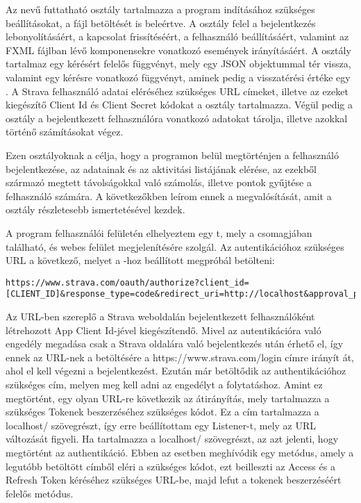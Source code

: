 Az  nevű futtatható osztály tartalmazza a program indításához szükséges beállításokat, a  fájl betöltését is beleértve.
A  osztály felel a bejelentkezés lebonyolításáért, a kapcsolat frissítéséért, a felhasználó beállításáért, valamint az FXML fájlban lévő komponensekre vonatkozó események irányításáért.
A  osztály tartalmaz egy  kérésért felelős függvényt, mely egy JSON objektummal tér vissza, valamint egy  kérésre vonatkozó függvényt, aminek pedig a visszatérési értéke egy .
A Strava felhasználó adatai eléréséhez szükséges URL címeket, illetve az ezeket kiegészítő Client Id és Client Secret kódokat a  osztály tartalmazza.
Végül pedig a  osztály a bejelentkezett felhasználóra vonatkozó adatokat tárolja, illetve azokkal történő számításokat végez. 

Ezen osztályoknak a célja, hogy a programon belül megtörténjen a felhasználó bejelentkezése, az adatainak és az aktivitási listájának elérése, az ezekből származó megtett távolságokkal való számolás, illetve pontok gyűjtése a felhasználó számára.
A következőkben leírom ennek a megvalósítását, amit a  osztály részletesebb ismertetésével kezdek. 

A program felhasználói felületén elhelyeztem egy t, mely a  csomagjában található, és webes felület megjelenítésére szolgál.
Az autentikációhoz szükséges URL a következő, melyet a -hoz beállított  megpróbál betölteni: 

\begin{verbatim}
https://www.strava.com/oauth/authorize?client_id=[CLIENT_ID]&response_type=code&redirect_uri=http://localhost&approval_prompt=force&scope=activity:read_all 
\end{verbatim}

Az URL-ben szereplő \CodeName{[CLIENT\_ID]} a Strava weboldalán bejelentkezett felhasználóként létrehozott App Client Id-jével kiegészítendő.
Mivel az autentikációra való engedély megadása csak a Strava oldalára való bejelentkezés után érhető el, így ennek az URL-nek a betöltésére a https://www.strava.com/login címre irányít át, ahol el kell végezni a bejelentkezést. Ezután már betöltődik az authentikációhoz szükséges cím, melyen meg kell adni az engedélyt a folytatáshoz. Amint ez megtörtént, egy olyan URL-re következik az átirányítás, mely tartalmazza a szükséges Tokenek beszerzéséhez szükséges kódot. Ez a cím tartalmazza a localhost/ szövegrészt, így erre beállítottam egy Listener-t, mely az URL változását figyeli. Ha tartalmazza a localhost/ szövegrészt, az azt jelenti, hogy megtörtént az authentikáció. Ebben az esetben meghívódik egy metódus, amely a legutóbb betöltött címből eléri a szükséges kódot, ezt beilleszti az Access és a Refresh Token kéréséhez szükséges URL-be, majd lefut a tokenek beszerzéséért felelős metódus. 

